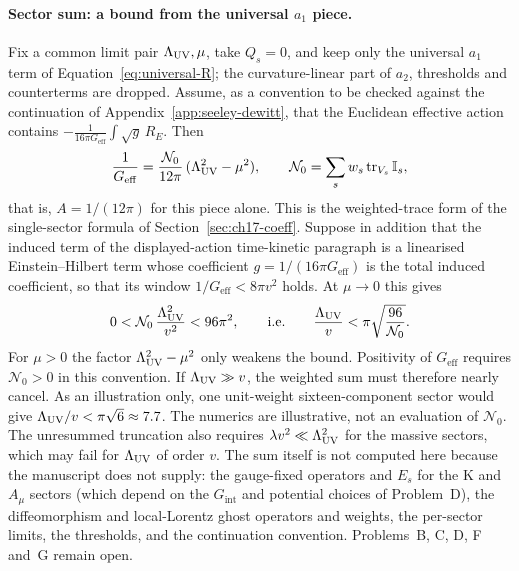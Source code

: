 \paragraph{Sector sum: a bound from the universal \(a_1\) piece.}
Fix a common limit pair \(\Lambda_{\mathrm{UV}},\mu\), take \(Q_s=0\), and keep only the
universal \(a_1\) term of Equation~\eqref{eq:universal-R}; the
curvature-linear part of \(a_2\), thresholds and counterterms are
dropped. Assume, as a convention to be checked against the
continuation of Appendix~\ref{app:seeley-dewitt}, that the Euclidean
effective action contains
\(-\tfrac{1}{16\pi G_{\mathrm{eff}}}\int\sqrt g\,R_E\). Then
\[
  \frac1{G_{\mathrm{eff}}}
  =\frac{\mathcal N_0}{12\pi}\,(\Lambda_{\mathrm{UV}}^2-\mu^2),
  \qquad
  \mathcal N_0=\sum_{s}w_s\operatorname{tr}_{V_s}\mathbb I_s ,
\]
that is, \(A=1/(12\pi)\) for this piece alone. This is the
weighted-trace form of the single-sector formula of
Section~\ref{sec:ch17-coeff}. Suppose in addition that the induced term
of the displayed-action time-kinetic paragraph is a linearised
Einstein--Hilbert term whose coefficient \(g=1/(16\pi G_{\mathrm{eff}})\)
is the total induced coefficient, so that its window
\(1/G_{\mathrm{eff}}<8\pi v^2\) holds. At \(\mu\to0\) this gives
\[
  0<\mathcal N_0\,\frac{\Lambda_{\mathrm{UV}}^2}{v^2}<96\pi^2,
  \qquad\text{i.e.}\qquad
  \frac{\Lambda_{\mathrm{UV}}}{v}<\pi\sqrt{\frac{96}{\mathcal N_0}} .
\]
For \(\mu>0\) the factor \(\Lambda_{\mathrm{UV}}^2-\mu^2\) only weakens the bound.
Positivity of \(G_{\mathrm{eff}}\) requires \(\mathcal N_0>0\) in this
convention. If \(\Lambda_{\mathrm{UV}}\gg v\), the weighted sum must therefore nearly
cancel. As an illustration only, one unit-weight sixteen-component
sector would give \(\Lambda_{\mathrm{UV}}/v<\pi\sqrt6\approx7.7\). The numerics are
illustrative, not an evaluation of \(\mathcal N_0\). The unresummed
truncation also requires \(\lambda v^2\ll\Lambda_{\mathrm{UV}}^2\) for the massive
sectors, which may fail for \(\Lambda_{\mathrm{UV}}\) of order \(v\). The sum itself is
not computed here because the manuscript does not supply: the
gauge-fixed operators and \(E_s\) for the \(\mathrm K\) and
\(A_\mu\) sectors (which depend on the \(G_{\mathrm{int}}\) and
potential choices of Problem~D), the diffeomorphism and local-Lorentz
ghost operators and weights, the per-sector limits, the thresholds,
and the continuation convention. Problems~B, C, D, F and~G remain open.

